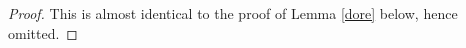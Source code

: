 \documentclass[a4paper]{article}
\begin{document}
\begin{proof}
This is almost identical to the proof of Lemma \ref{dore} below, hence omitted.

\end{proof}
\end{document}
